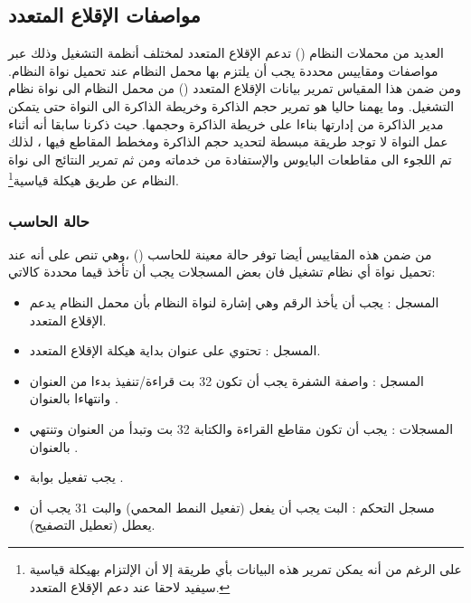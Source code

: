 \documentclass[document.tex]{subfiles}
\begin{document}
\subsection{مواصفات الإقلاع المتعدد}
العديد من محملات النظام () تدعم الإقلاع المتعدد لمختلف أنظمة التشغيل وذلك عبر مواصفات ومقاييس محددة يجب أن يلتزم بها محمل النظام عند تحميل نواة النظام. ومن ضمن هذا المقياس  تمرير بيانات الإقلاع المتعدد () من محمل النظام الى نواة نظام التشغيل. وما يهمنا حاليا هو تمرير حجم الذاكرة وخريطة الذاكرة الى النواة حتى يتمكن مدير الذاكرة من إدارتها بناءا على خريطة الذاكرة وحجمها. حيث ذكرنا سابقا أنه أثناء عمل النواة لا توجد طريقة مبسطة لتحديد حجم الذاكرة ومخطط المقاطع فيها ، لذلك تم اللجوء الى مقاطعات البايوس والإستفادة من خدماته ومن ثم تمرير النتائج الى نواة النظام عن طريق هيكلة قياسية\footnote{على الرغم من أنه يمكن تمرير هذه البيانات بأي طريقة إلا أن الإلتزام بهيكلة قياسية سيفيد لاحقا عند دعم الإقلاع المتعدد.}.

\subsubsection{حالة الحاسب} 
من ضمن هذه المقاييس أيضا توفر حالة معينة للحاسب () ،وهي تنص على أنه عند تحميل نواة أي نظام تشغيل فان بعض المسجلات يجب أن تأخذ قيما محددة كالاتي:

\begin{itemize}
\item المسجل : يجب أن يأخذ الرقم  وهي إشارة لنواة النظام بأن محمل النظام يدعم الإقلاع المتعدد.
\item المسجل : تحتوي على عنوان بداية هيكلة الإقلاع المتعدد.
\item المسجل : واصفة الشفرة يجب أن تكون 32 بت قراءة/تنفيذ بدءا من العنوان  وانتهاءا بالعنوان .
\item المسجلات : يجب أن تكون مقاطع القراءة والكتابة 32 بت وتبدأ من العنوان  وتنتهي بالعنوان .
\item يجب تفعيل بوابة .
\item مسجل التحكم : البت  يجب أن يفعل (تفعيل النمط المحمي) والبت 31 يجب أن يعطل (تعطيل التصفيح).
\end{itemize}
\end{document}
